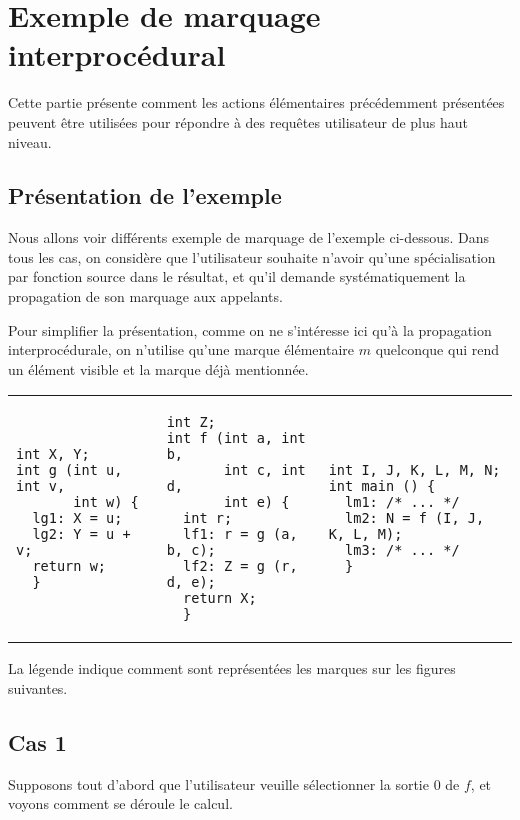 
\chapter{Exemple de marquage interprocédural}

Cette partie présente comment les actions élémentaires précédemment présentées
peuvent être utilisées pour répondre à des requêtes utilisateur de plus haut
niveau. 


\section{Présentation de l'exemple}

Nous allons voir différents exemple de marquage de l'exemple ci-dessous.
Dans tous les cas, on considère que l'utilisateur souhaite n'avoir qu'une
spécialisation par fonction source dans le résultat, et qu'il demande
systématiquement la propagation de son marquage aux appelants.
\bb

Pour simplifier la présentation,
comme on ne s'intéresse ici qu'à la propagation interprocédurale,
on n'utilise qu'une marque élémentaire $m$ quelconque qui rend un élément
visible et la marque \spare{} déjà mentionnée.

\noindent\begin{tabular}{p{4cm}p{4.5cm}p{5cm}}
\begin{verbatim}
int X, Y;
int g (int u, int v, 
       int w) {
  lg1: X = u;
  lg2: Y = u + v;
  return w;
  }
\end{verbatim}
&
\begin{verbatim}
int Z;
int f (int a, int b, 
       int c, int d, 
       int e) {
  int r;
  lf1: r = g (a, b, c);
  lf2: Z = g (r, d, e);
  return X;
  }
\end{verbatim}
&
\begin{verbatim}
int I, J, K, L, M, N;
int main () {
  lm1: /* ... */
  lm2: N = f (I, J, K, L, M);
  lm3: /* ... */
  }
\end{verbatim}
\end{tabular}

\bb\centerline{}\bb

La légende indique comment sont représentées les marques sur les figures
suivantes.

\section{Cas 1}

Supposons tout d'abord que l'utilisateur veuille sélectionner la sortie 0
de $f$, et voyons comment se déroule le calcul.\bb

